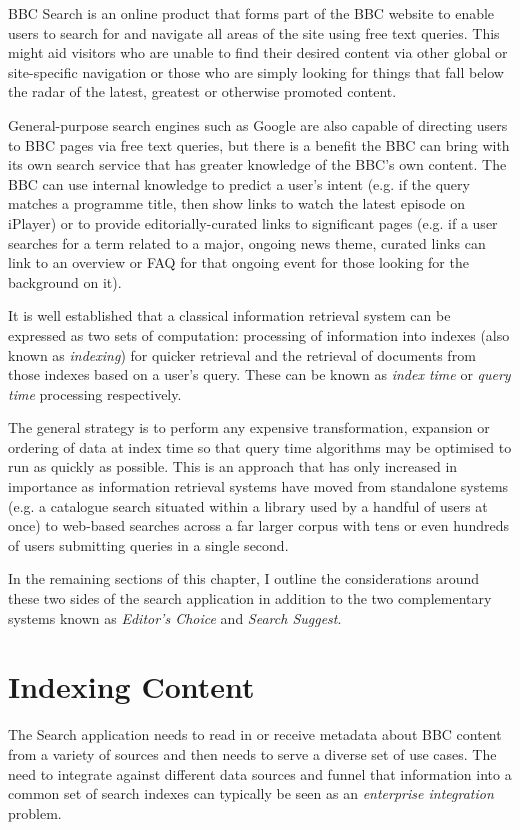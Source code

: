 BBC Search is an online product that forms part of the BBC website
to enable users to search for and navigate all areas of the site using
free text queries. This might aid visitors who are unable to find their desired
content via other global or site-specific navigation or those who are simply
looking for things that fall below the radar of the latest, greatest or
otherwise promoted content.

General-purpose search engines such as Google are also capable of directing
users to BBC pages via free text queries, but there is a benefit the BBC
can bring with its own search service that has greater knowledge of the
BBC's own content. The BBC can use internal knowledge to predict a user's
intent (e.g. if the query matches a programme title, then show links to watch
the latest episode on iPlayer) or to provide editorially-curated
links to significant pages (e.g. if a user searches for a term
related to a major, ongoing news theme, curated links can
link to an overview or FAQ for that ongoing event for those
looking for the background on it).

It is well established that a classical information retrieval system
can be expressed as two sets of computation: processing of information
into indexes (also known as \emph{indexing}) for quicker retrieval
and the retrieval of documents from those indexes based on a user's
query. These can be known as \emph{index time} or \emph{query time}
processing respectively.

The general strategy is to perform
any expensive transformation, expansion or ordering of data
at index time so that query time algorithms may be optimised to
run as quickly as possible. This is an approach that has only
increased in importance as information retrieval systems have moved
from standalone systems (e.g. a catalogue search situated within
a library used by a handful of users at once) to web-based
searches across a far larger corpus with tens or even hundreds of
users submitting queries in a single second.

In the remaining sections of this chapter, I outline the considerations
around these two sides of the search application in addition to the
two complementary systems known as \emph{Editor's Choice} and
\emph{Search Suggest}.

\section{Indexing Content}

The Search application needs to read in or receive metadata about
BBC content from a variety of sources and then needs to serve
a diverse set of use cases.\cite{fenning2014applicability} The
need to integrate against different data sources and funnel
that information into a common set of search indexes can
typically be seen as an \emph{enterprise integration}
problem.

